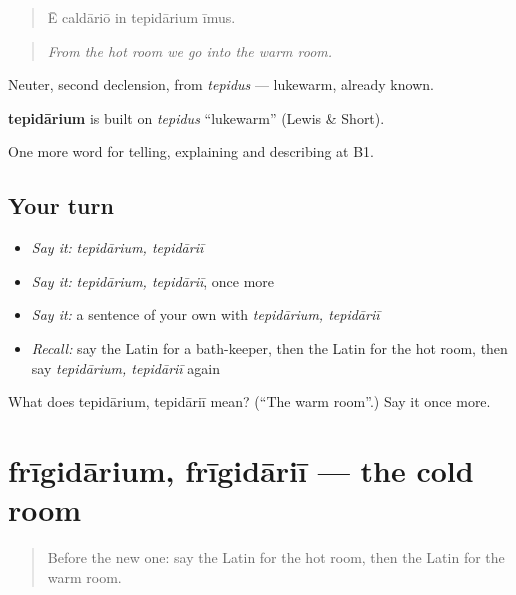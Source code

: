 \begin{quote}
Ē caldāriō in tepidārium īmus.
\end{quote}

\begin{quote}
\emph{From the hot room we go into the warm room.}
\end{quote}

Neuter, second declension, from \emph{tepidus} — lukewarm, already known.

\begin{cousinweb}
\textbf{tepidārium} is built on \emph{tepidus} \textquotedblleft{}lukewarm\textquotedblright{} (Lewis \& Short).
\end{cousinweb}

\begin{grammarlens}[title={What you've built}]
One more word for telling, explaining and describing at B1.
\end{grammarlens}

\subsection*{Your turn}
\begin{itemize}
\raggedright
  \item \emph{Say it:} \emph{tepidārium, tepidāriī}
  \item \emph{Say it:} \emph{tepidārium, tepidāriī}, once more
  \item \emph{Say it:} a sentence of your own with \emph{tepidārium, tepidāriī}
  \item \emph{Recall:} say the Latin for a bath-keeper, then the Latin for the hot room, then say \emph{tepidārium, tepidāriī} again
\end{itemize}

\begin{tcolorbox}[breakable,colback=teal!4,colframe=teal!35!black,title={Before you move on}]
What does tepidārium, tepidāriī mean? (\textquotedblleft{}The warm room\textquotedblright{}.) Say it once more.
\end{tcolorbox}
\section[frīgidārium, frīgidāriī]{frīgidārium, frīgidāriī — the cold room}

\label{lesson:LA-C541-frigidarium}



\begin{quote}
Before the new one: say the Latin for the hot room, then the Latin for the warm room.
\end{quote}

